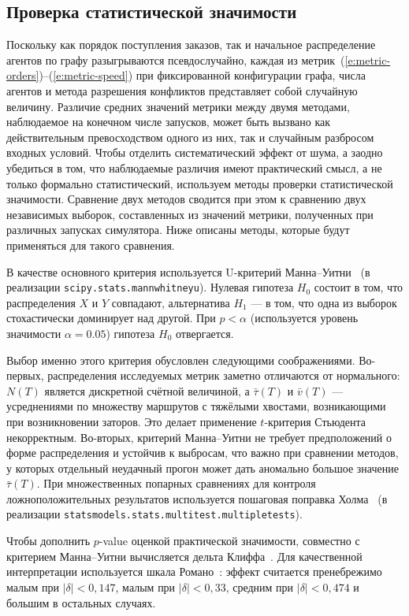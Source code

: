 \subsection{Проверка статистической значимости}

Поскольку как порядок поступления заказов, так и начальное распределение агентов по графу разыгрываются 
псевдослучайно, каждая из метрик~(\ref{e:metric-orders})--(\ref{e:metric-speed}) при фиксированной 
конфигурации графа, числа агентов и метода разрешения конфликтов представляет собой случайную величину. 
Различие средних значений метрики между двумя методами, наблюдаемое на конечном числе запусков, может 
быть вызвано как действительным превосходством одного из них, так и случайным разбросом входных условий. 
Чтобы отделить систематический эффект от шума, а заодно убедиться в том, что наблюдаемые различия имеют 
практический смысл, а не только формально статистический, используем методы  проверки статистической 
значимости. Сравнение двух методов сводится при этом к сравнению двух независимых выборок, составленных 
из значений метрики, полученных при различных запусках симулятора.  Ниже описаны методы, которые будут 
применяться для такого сравнения.

В качестве основного критерия используется U-критерий Манна--Уитни~\cite{mann-test} 
(в реализации \texttt{scipy.stats.mannwhitneyu}). Нулевая гипотеза $H_0$ состоит в том, что 
распределения $X$ и $Y$ совпадают, альтернатива $H_1$ --- в том, что одна из выборок стохастически 
доминирует над другой. При $p < \alpha$ (используется уровень значимости $\alpha = 0.05$) гипотеза $H_0$ отвергается.

Выбор именно этого критерия обусловлен следующими соображениями. Во-первых, распределения исследуемых 
метрик заметно отличаются от нормального: $N(T)$ является дискретной счётной величиной, а $\bar\tau(T)$ и 
$\bar v(T)$ --- усреднениями по множеству маршрутов с тяжёлыми хвостами, возникающими при возникновении 
заторов. Это делает применение $t$-критерия Стьюдента некорректным. Во-вторых, критерий Манна--Уитни не 
требует предположений о форме распределения и устойчив к выбросам, что важно при сравнении методов, 
у которых отдельный неудачный прогон может дать аномально большое значение $\bar\tau(T)$. При множественных 
попарных сравнениях для контроля ложноположительных результатов используется пошаговая поправка Холма~\cite{holm} 
(в реализации \texttt{statsmodels.stats.multitest.multipletests}).

Чтобы дополнить $p$-value оценкой практической значимости, совместно с критерием Манна--Уитни 
вычисляется дельта Клиффа~\cite{cliff}. Для качественной интерпретации используется шкала 
Романо~\cite{romano}: эффект считается пренебрежимо малым при $|\delta| < 0{,}147$, малым при 
$|\delta| < 0{,}33$, средним при $|\delta| < 0{,}474$ и большим в остальных случаях.

